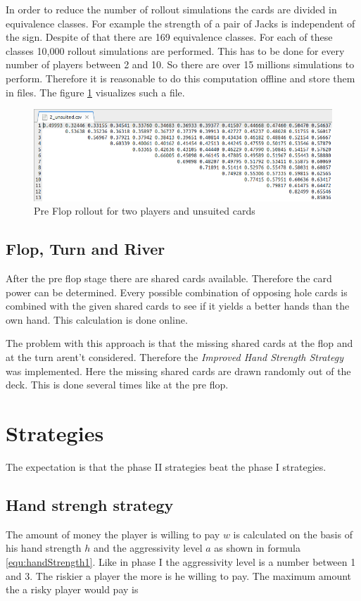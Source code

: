 In order to reduce the number of rollout simulations the cards are divided in equivalence classes. For example the strength of a pair of Jacks is independent of the sign. Despite of that there are 169 equivalence classes. For each of these classes 10,000 rollout simulations are performed. This has to be done for every number of players between 2 and 10. So there are over 15 millions simulations to perform. Therefore it is reasonable to do this computation offline and store them in files. The figure \ref{fig:preflop} visualizes such a file.

\begin{figure}[h]
  \centering
  \includegraphics[width=1.0\textwidth]{images/preflop}
  \caption{Pre Flop rollout for two players and unsuited cards}
  \label{fig:preflop}
\end{figure}

\subsection{Flop, Turn and River}
After the pre flop stage there are shared cards available. Therefore the card power can be determined. Every possible combination of opposing hole cards is combined with the given shared cards to see if it yields a better hands than the own hand. This calculation is done online.

The problem with this approach is that the missing shared cards at the flop and at the turn arent't considered. Therefore the \emph{Improved Hand Strength Strategy} was implemented. Here the missing shared cards are drawn randomly out of the deck. This is done several times like at the pre flop.

\section{Strategies}
The expectation is that the phase II strategies beat the phase I strategies.

\subsection{Hand strengh strategy}
The amount of money the player is willing to pay $w$ is calculated on the basis of his hand strength $h$ and the aggressivity level $a$ as shown in formula \ref{equ:handStrength1}. Like in phase I the aggressivity level is a number between 1 and 3. The riskier a player the more is he willing to pay. The maximum amount the a risky player would pay is 

